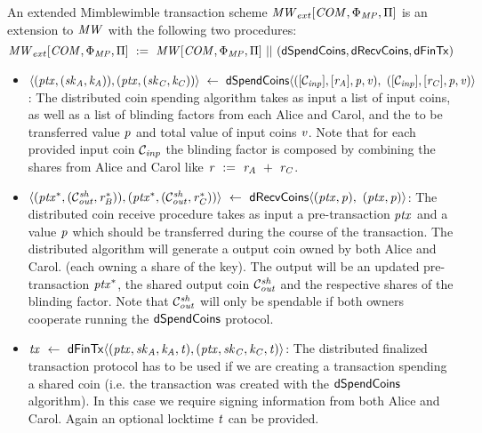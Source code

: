 \begin{definition}
    \label{def:ext-mw-tx-scheme}
    An extended Mimblewimble transaction scheme $\mathit{MW}_{ext}[\mathit{COM},\Phi_{\mathit{MP}},\Pi]$ is an extension to $\mathit{MW}$ with the following two procedures:
    \[ \mathit{MW}_{ext}[\mathit{COM},\Phi_{\mathit{MP}},\Pi] ~:=~ \mathit{MW}[\mathit{COM},\Phi_{\mathit{MP}},\Pi] ~||~ (\mathsf{dSpendCoins}, \mathsf{dRecvCoins}, \mathsf{dFinTx}) \]
    \begin{itemize}
        \item $\langle (\mathit{ptx},(\mathit{sk}_{\mathit{A}},\mathit{\mathit{k}_{\mathit{A}}})), (\mathit{ptx},(\mathit{sk}_{\mathit{C}},\mathit{\mathit{k}_{\mathit{C}}})) \rangle \\
        ~\leftarrow~ \mathsf{dSpendCoins} \langle ([\mathcal{C}_{\mathit{inp}}],[\mathit{r}_{\mathit{A}}],\mathit{p},\mathit{v}) ,~ ([\mathcal{C}_{\mathit{inp}}],[\mathit{r}_{\mathit{C}}],\mathit{p},\mathit{v}) \rangle$:
        The distributed coin spending algorithm takes as input a list of input coins, as well as a list of blinding factors from each Alice and Carol, and the to be transferred value $\mathit{p}$ and
        total value of input coins $\mathit{v}$. Note that for each provided input coin $\mathcal{C}_{\mathit{inp}}$ the blinding factor is composed by combining the shares from Alice and Carol like
        $\mathit{r} ~:=~ \mathit{r}_{\mathit{A}} ~+~ \mathit{r}_{\mathit{C}}$.
        \item $\langle (\mathit{ptx}^*, (\mathcal{C}_{\mathit{out}}^{\mathit{sh}}, \mathit{r}_{\mathit{B}}^*)), (\mathit{ptx}^*, (\mathcal{C}_{\mathit{out}}^{\mathit{sh}}, \mathit{r}_{\mathit{C}}^*)) \rangle ~\leftarrow~ \mathsf{dRecvCoins} \langle(\mathit{ptx},\mathit{p}) ,~ (\mathit{ptx},\mathit{p}) \rangle$: The distributed coin receive procedure takes as input a pre-transaction $\mathit{ptx}$ and
        a value $\mathit{p}$ which should be transferred during the course of the transaction.
        The distributed algorithm will generate a output coin owned by both Alice and Carol. (each owning a share of the key).
        The output will be an updated pre-transaction $\mathit{ptx}^*$, the shared output coin $\mathcal{C}_{\mathit{out}}^{\mathit{sh}}$ and the respective shares of the blinding factor.
        Note that $\mathcal{C}_{\mathit{out}}^{\mathit{sh}}$ will only be spendable if both owners cooperate running the $\mathsf{dSpendCoins}$ protocol.
        \item $\mathit{tx} ~\leftarrow~ \mathsf{dFinTx} \langle(\mathit{ptx},\mathit{sk}_{\mathit{A}},\mathit{\mathit{k}_{\mathit{A}}},\mathit{t}),(\mathit{ptx},\mathit{sk}_{\mathit{C}},\mathit{\mathit{k}_{\mathit{C}}},\mathit{t})\rangle$: The distributed finalized transaction protocol has to be used if we are creating a transaction spending a shared coin (i.e. the transaction was created with the $\mathsf{dSpendCoins}$ algorithm).
        In this case we require signing information from both Alice and Carol.
        Again an optional locktime $\mathit{t}$ can be provided.
    \end{itemize}
\end{definition}

